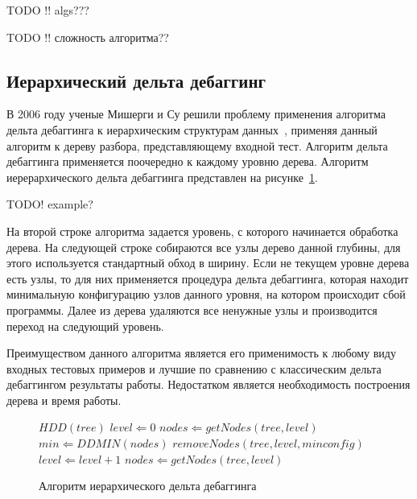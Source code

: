 TODO !! algs???

TODO !! сложность алгоритма??

\subsection{Иерархический дельта дебаггинг}
В 2006 году ученые Мишерги и Су решили проблему применения алгоритма дельта дебаггинга к иерархическим структурам данных~\cite{misherghi2006hdd}, применяя данный алгоритм к дереву разбора, представляющему входной тест. Алгоритм дельта дебаггинга применяется поочередно к каждому уровню дерева. Алгоритм иерерархического дельта дебаггинга представлен на рисунке~\ref{alg:hdd}. 

TODO! example? 

На второй строке алгоритма задается уровень, с которого начинается обработка дерева. На следующей строке собираются все узлы дерево данной глубины, для этого используется стандартный обход в ширину. Если не текущем уровне дерева есть узлы, то для них применяется процедура дельта дебаггинга, которая находит минимальную конфигурацию узлов данного уровня, на котором происходит сбой программы. Далее из дерева удаляются все ненужные узлы и производится переход на следующий уровень. 

Преимуществом данного алгоритма является его применимость к любому виду входных тестовых примеров и лучшие по сравнению с классическим дельта дебаггингом результаты работы. Недостатком является необходимость построения дерева и время работы.
\begin{figure}[h]
\begin{algorithmic}[1]
\STATE $HDD(tree)$
\STATE $level \Leftarrow 0$
\STATE $nodes \Leftarrow getNodes(tree, level)$
	\STATE $min \Leftarrow DDMIN(nodes)$
	\STATE $removeNodes(tree, level, minconfig)$
	\STATE $level \Leftarrow level + 1$
	\STATE $nodes \Leftarrow getNodes(tree, level)$
\ENDWHILE
\end{algorithmic}
\caption{Алгоритм иерархического дельта дебаггинга}
\label{alg:hdd}
\end{figure}



